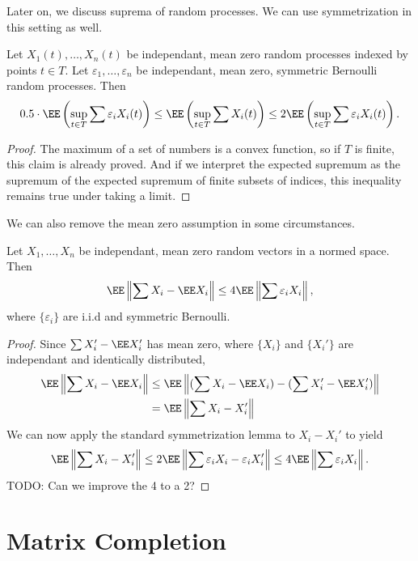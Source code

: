 Later on, we discuss suprema of random processes. We can use symmetrization in this setting as well.

\begin{lemma}
    Let $X_1(t), \dots, X_n(t)$ be independant, mean zero random processes indexed by points $t \in T$. Let $\varepsilon_1, \dots, \varepsilon_n$ be independant, mean zero, symmetric Bernoulli random processes. Then
    \[ 0.5 \cdot \EE \left( \sup_{t \in T} \sum \varepsilon_i X_i(t) \right) \leq \EE \left( \sup_{t \in T} \sum X_i(t) \right) \leq 2 \EE \left( \sup_{t \in T} \sum \varepsilon_i X_i(t) \right). \]
\end{lemma}
\begin{proof}
	The maximum of a set of numbers is a convex function, so if $T$ is finite, this claim is already proved. And if we interpret the expected supremum as the supremum of the expected supremum of finite subsets of indices, this inequality remains true under taking a limit.
\end{proof}

We can also remove the mean zero assumption in some circumstances.

\begin{theorem}
	Let $X_1, \dots, X_n$ be independant, mean zero random vectors in a normed space. Then
	\[ \EE \left\| \sum X_i - \EE X_i \right\| \leq 4 \EE \left\| \sum \varepsilon_i X_i \right\|, \]
	where $\{ \varepsilon_i \}$ are i.i.d and symmetric Bernoulli.
\end{theorem}
\begin{proof}
	Since $\sum X_i' - \EE X_i'$ has mean zero, where $\{ X_i \}$ and $\{ X_i' \}$ are independant and identically distributed,
	\begin{align*}
		\EE \left\| \sum X_i - \EE X_i \right\| &\leq \EE \left\| (\sum X_i - \EE X_i) - (\sum X_i' - \EE X_i') \right\|\\
		&= \EE \left\| \sum X_i - X_i' \right\|
	\end{align*}
	We can now apply the standard symmetrization lemma to $X_i - X_i'$ to yield
	\[ \EE \left\| \sum X_i - X_i' \right\| \leq 2 \EE \left\| \sum \varepsilon_i X_i - \varepsilon_i X_i' \right\| \leq 4 \EE \left\| \sum \varepsilon_i X_i \right\|. \]
	TODO: Can we improve the 4 to a 2?
\end{proof}


\section{Matrix Completion}






